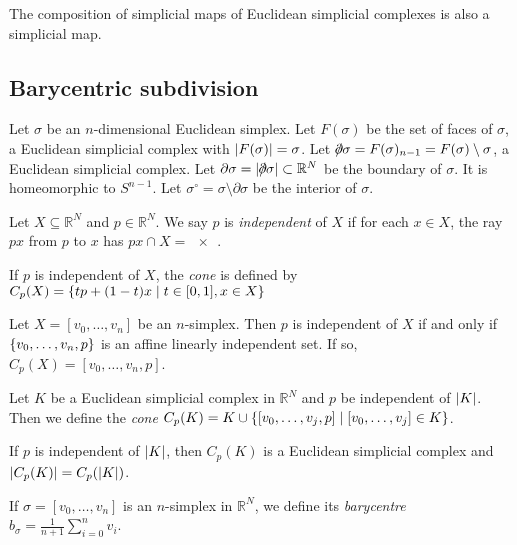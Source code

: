 \begin{remark}
	The composition of simplicial maps of Euclidean simplicial complexes is also a simplicial map.
\end{remark}

\subsection{Barycentric subdivision}
\begin{definition}
	Let \( \sigma \) be an \( n \)-dimensional Euclidean simplex.
	Let \( F(\sigma) \) be the set of faces of \( \sigma \), a Euclidean simplicial complex with \( \abs{F(\sigma)} = \sigma \).
	Let \( \bound \sigma = F(\sigma)_{n-1} = F(\sigma) \setminus \sigma \), a Euclidean simplicial complex.
	Let \( \partial \sigma = \abs{\bound \sigma} \subset \mathbb R^N \) be the boundary of \( \sigma \).
	It is homeomorphic to \( S^{n-1} \).
	Let \( \sigma^\circ = \sigma \setminus \partial \sigma \) be the interior of \( \sigma \).
\end{definition}
\begin{definition}
	Let \( X \subseteq \mathbb R^N \) and \( p \in \mathbb R^N \).
	We say \( p \) is \emph{independent} of \( X \) if for each \( x \in X \), the ray \( px \) from \( p \) to \( x \) has \( px \cap X = \qty{x} \).
\end{definition}
\begin{definition}
	If \( p \) is independent of \( X \), the \emph{cone} is defined by \( C_p(X) = \qty{tp + (1-t)x \mid t \in [0,1], x \in X} \)
\end{definition}
\begin{example}
	Let \( X = [v_0,\dots,v_n] \) be an \( n \)-simplex.
	Then \( p \) is independent of \( X \) if and only if \( \qty{v_0, \dots, v_n, p} \) is an affine linearly independent set.
	If so, \( C_p(X) = [v_0, \dots, v_n, p] \).
\end{example}
\begin{definition}
	Let \( K \) be a Euclidean simplicial complex in \( \mathbb R^N \) and \( p \) be independent of \( \abs{K} \).
	Then we define the \emph{cone} \( C_p(K) = K \cup \qty{[v_0, \dots, v_j, p] \mid [v_0, \dots, v_j] \in K} \).
\end{definition}
\begin{lemma}
	If \( p \) is independent of \( \abs{K} \), then \( C_p(K) \) is a Euclidean simplicial complex and \( \abs{C_p(K)} = C_p(\abs{K}) \).
\end{lemma}
\begin{definition}
	If \( \sigma = [v_0, \dots, v_n] \) is an \( n \)-simplex in \( \mathbb R^N \), we define its \emph{barycentre} \( b_\sigma = \frac{1}{n+1}\sum_{i=0}^n v_i \).
\end{definition}
